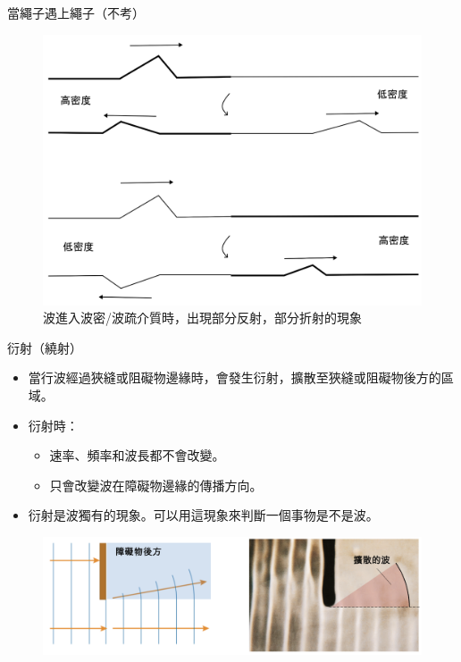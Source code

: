 \documentclass[13pt]{beamer}
\begin{document}
\begin{frame}{當繩子遇上繩子（不考）}
    \begin{figure}
        \centering
        \includegraphics[width=0.85\linewidth]{images/Screenshot 2023-09-28 at 10.16.23 AM.png}
        \caption{波進入波密/波疏介質時，出現部分反射，部分折射的現象}

    \end{figure}
\end{frame}

\begin{frame}{衍射（繞射）}
    \begin{itemize}
        \item 當行波經過狹縫或阻礙物邊緣時，會發生衍射，擴散至狹縫或阻礙物後方的區域。
        \item 衍射時：
              \begin{itemize}
                  \item 速率、頻率和波長都不會改變。
                  \item 只會改變波在障礙物邊緣的傳播方向。
              \end{itemize}
        \item 衍射是波獨有的現象。可以用這現象來判斷一個事物是不是波。
    \end{itemize}
    \begin{figure}
        \centering
        \includegraphics[width=1\linewidth]{images/Screenshot 2023-09-27 at 9.46.49 PM.png}


    \end{figure}
\end{frame}
\end{document}
